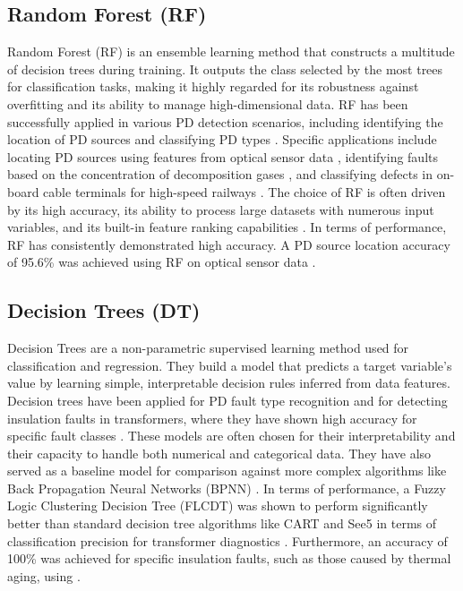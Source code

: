 \subsection{Random Forest (RF)}

Random Forest (RF) is an ensemble learning method that constructs a multitude of decision trees during training. It outputs the class selected by the most trees for classification tasks, making it highly regarded for its robustness against overfitting and its ability to manage high-dimensional data. RF has been successfully applied in various PD detection scenarios, including identifying the location of PD sources \parencite{Bag_2019_1} and classifying PD types \parencite{Prabhu_2016_1, Guo_2021_1}. Specific applications include locating PD sources using features from optical sensor data \parencite{Bag_2019_1}, identifying faults based on the concentration of decomposition gases \parencite{Tan_2022}, and classifying defects in on-board cable terminals for high-speed railways \parencite{Guo_2021_1}. The choice of RF is often driven by its high accuracy, its ability to process large datasets with numerous input variables, and its built-in feature ranking capabilities \parencite{Bag_2019_1}. In terms of performance, RF has consistently demonstrated high accuracy. A PD source location accuracy of 95.6\% was achieved using RF on optical sensor data \parencite{Bag_2019_1}. \subsection{Decision Trees (DT)}

Decision Trees are a non-parametric supervised learning method used for classification and regression. They build a model that predicts a target variable's value by learning simple, interpretable decision rules inferred from data features. Decision trees have been applied for PD fault type recognition \parencite{Lee_2020_1} and for detecting insulation faults in transformers, where they have shown high accuracy for specific fault classes \parencite{Maseko_2025}. These models are often chosen for their interpretability and their capacity to handle both numerical and categorical data. They have also served as a baseline model for comparison against more complex algorithms like Back Propagation Neural Networks (BPNN) \parencite{Fei_2024_1}. In terms of performance, a Fuzzy Logic Clustering Decision Tree (FLCDT) was shown to perform significantly better than standard decision tree algorithms like CART and See5 in terms of classification precision for transformer diagnostics \parencite{Lee_2020_1}. Furthermore, an accuracy of 100\% was achieved for specific insulation faults, such as those caused by thermal aging, using \parencite{Maseko_2025}.

